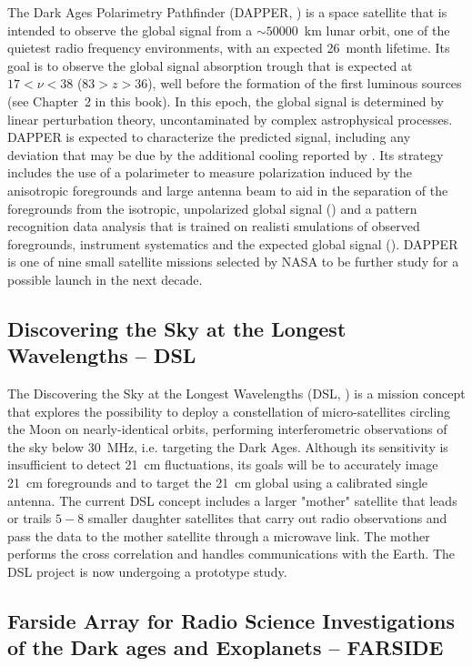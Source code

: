 The Dark Ages Polarimetry Pathfinder (DAPPER, \cite{burns19}) is a space satellite that is intended to observe the global signal from a $\sim 50000$~km lunar orbit, one of the quietest radio frequency environments, with an expected 26~month lifetime. Its goal is to observe the global signal absorption trough that is expected at $17 < \nu < 38$ ($83 > z > 36$), well before the formation of the first luminous sources (see Chapter~2 in this book). In this epoch, the global signal is determined by linear perturbation theory, uncontaminated by complex astrophysical processes. DAPPER is expected to characterize the predicted signal, including any deviation that may be due by the additional cooling reported by \cite{bowman18}. Its strategy includes the use of a polarimeter to measure polarization induced by the anisotropic foregrounds and large antenna beam to aid in the separation of the foregrounds from the isotropic, unpolarized global signal (\cite{nhan17}) and a pattern recognition data analysis that is trained on realisti smulations of observed foregrounds, instrument systematics and the expected global signal (\cite{tauscher18}).
%
DAPPER is one of nine small satellite missions selected by NASA to be further study for a possible launch in the next decade.



\subsection{Discovering the Sky at the Longest Wavelengths -- DSL}

The Discovering the Sky at the Longest Wavelengths (DSL, \cite{chen19}) is a mission concept that explores the possibility to deploy a constellation of micro-satellites circling the Moon on nearly-identical orbits, performing interferometric observations of the sky below 30~MHz, i.e. targeting the Dark Ages. 
Although its sensitivity is insufficient to detect 21~cm fluctuations, its goals will be to accurately image 21~cm foregrounds and to target the 21~cm global using a calibrated single antenna. 
The current DSL concept includes a larger "mother" satellite that leads or trails $5-8$ smaller daughter satellites that carry out radio observations and pass the data to the mother satellite through a microwave link. The mother performs the cross correlation and handles communications with the Earth. 
The DSL project is now undergoing a prototype study.




\subsection{Farside Array for Radio Science Investigations of the Dark ages and Exoplanets -- FARSIDE}

